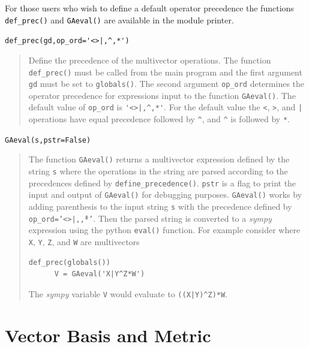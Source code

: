 \documentclass[12pt,twoside,openright]{memoir}
\newcommand{\T}[1]{\texttt{#1}}
\begin{document}
For those users who wish to define a default operator precedence the functions
\T{def\_prec()} and \T{GAeval()} are available in the module printer.

   \lstinline$def_prec(gd,op_ord='<>|,^,*')$
   \begin{quote}
   Define the precedence of the multivector operations.  The function
   \T{def\_prec()} must be called from the main program and the
   first argument \T{gd} must be set to \T{globals()}.  The second argument
   \T{op\_ord} determines the operator precedence for expressions input to
   the function \T{GAeval()}. The default value of \T{op\_ord} is \lstinline$'<>|,^,*'$.
   For the default value the \T{<}, \T{>}, and \T{|} operations have equal
   precedence followed by \T{\^}, and \T{\^} is followed by \T{*}.
   \end{quote}
  
   \T{GAeval(s,pstr=False)}
   \begin{quote}
   The function \T{GAeval()} returns a multivector expression defined by the
   string \T{s} where the operations in the string are parsed according to
   the precedences defined by \T{define\_precedence()}. \T{pstr} is a flag
   to print the input and output of \T{GAeval()} for debugging purposes.
   \T{GAeval()} works by adding parenthesis to the input string \T{s} with the
   precedence defined by \T{op\_ord='<>|,\^,*'}.  Then the parsed string is
   converted to a \emph{sympy} expression using the python \T{eval()} function.
   For example consider where \T{X}, \T{Y}, \T{Z}, and \T{W} are multivectors
	\begin{lstlisting}[numbers=none]
      def_prec(globals())
      V = GAeval('X|Y^Z*W')
	\end{lstlisting}
   The \emph{sympy} variable \T{V} would evaluate to \lstinline!((X|Y)^Z)*W!.
   \end{quote}

\section{Vector Basis and Metric}\label{BasisMetric}
\end{document}
